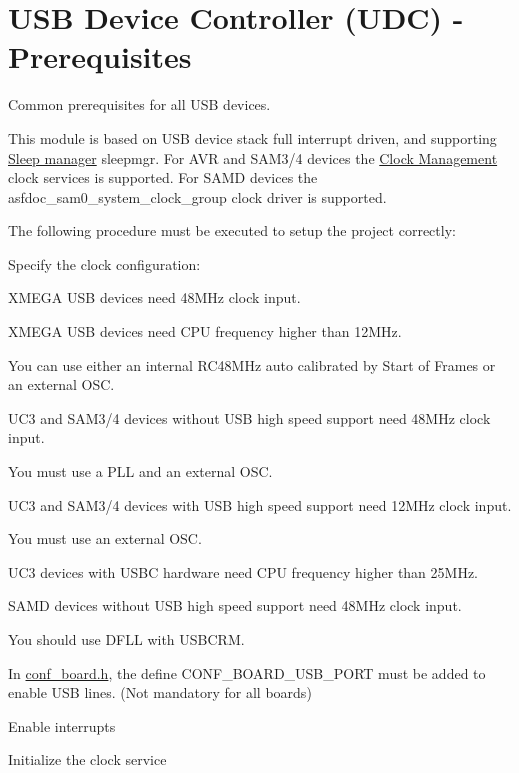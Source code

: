 \hypertarget{group__udc__basic__use__case__setup__prereq}{\section{U\-S\-B Device Controller (U\-D\-C) -\/ Prerequisites}
\label{group__udc__basic__use__case__setup__prereq}
}
Common prerequisites for all U\-S\-B devices.

This module is based on U\-S\-B device stack full interrupt driven, and supporting \hyperlink{group__sleepmgr__group}{Sleep manager} sleepmgr. For A\-V\-R and S\-A\-M3/4 devices the \hyperlink{group__clk__group}{Clock Management} clock services is supported. For S\-A\-M\-D devices the asfdoc\-\_\-sam0\-\_\-system\-\_\-clock\-\_\-group clock driver is supported.

The following procedure must be executed to setup the project correctly\-:
\begin{DoxyItemize}
\item Specify the clock configuration\-:
\begin{DoxyItemize}
\item X\-M\-E\-G\-A U\-S\-B devices need 48\-M\-Hz clock input.\par
 X\-M\-E\-G\-A U\-S\-B devices need C\-P\-U frequency higher than 12\-M\-Hz.\par
 You can use either an internal R\-C48\-M\-Hz auto calibrated by Start of Frames or an external O\-S\-C.
\item U\-C3 and S\-A\-M3/4 devices without U\-S\-B high speed support need 48\-M\-Hz clock input.\par
 You must use a P\-L\-L and an external O\-S\-C.
\item U\-C3 and S\-A\-M3/4 devices with U\-S\-B high speed support need 12\-M\-Hz clock input.\par
 You must use an external O\-S\-C.
\item U\-C3 devices with U\-S\-B\-C hardware need C\-P\-U frequency higher than 25\-M\-Hz.
\item S\-A\-M\-D devices without U\-S\-B high speed support need 48\-M\-Hz clock input.\par
 You should use D\-F\-L\-L with U\-S\-B\-C\-R\-M.
\end{DoxyItemize}
\item In \hyperlink{conf__board_8h}{conf\-\_\-board.\-h}, the define C\-O\-N\-F\-\_\-\-B\-O\-A\-R\-D\-\_\-\-U\-S\-B\-\_\-\-P\-O\-R\-T must be added to enable U\-S\-B lines. (Not mandatory for all boards)
\item Enable interrupts
\item Initialize the clock service
\end{DoxyItemize}

